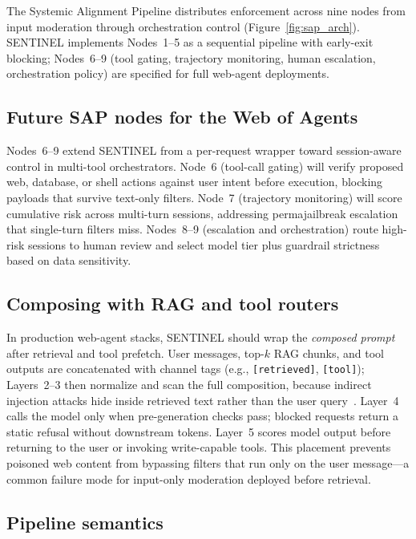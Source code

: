 \documentclass[conference]{IEEEtran}
\newcommand{\sap}{Systemic Alignment Pipeline}
\begin{document}
The \sap{} distributes enforcement across nine nodes from input moderation
through orchestration control (Figure~\ref{fig:sap_arch}).
SENTINEL implements Nodes~1--5 as a sequential pipeline with early-exit blocking;
Nodes~6--9 (tool gating, trajectory monitoring, human escalation, orchestration
policy) are specified for full web-agent deployments.

\subsection{Future SAP nodes for the Web of Agents}

Nodes~6--9 extend SENTINEL from a per-request wrapper toward session-aware
control in multi-tool orchestrators.
Node~6 (tool-call gating) will verify proposed web, database, or shell actions
against user intent before execution, blocking payloads that survive text-only
filters.
Node~7 (trajectory monitoring) will score cumulative risk across multi-turn
sessions, addressing permajailbreak escalation~\cite{anil2024many} that
single-turn filters miss.
Nodes~8--9 (escalation and orchestration) route high-risk sessions to human
review and select model tier plus guardrail strictness based on data sensitivity.

\subsection{Composing with RAG and tool routers}

In production web-agent stacks, SENTINEL should wrap the \emph{composed prompt}
after retrieval and tool prefetch.
User messages, top-$k$ RAG chunks, and tool outputs are concatenated with
channel tags (e.g., \texttt{[retrieved]}, \texttt{[tool]}); Layers~2--3 then
normalize and scan the full composition, because indirect injection attacks hide
inside retrieved text rather than the user query~\cite{greshake2023not,liu2024lost}.
Layer~4 calls the model only when pre-generation checks pass; blocked requests
return a static refusal without downstream tokens.
Layer~5 scores model output before returning to the user or invoking write-capable
tools.
This placement prevents poisoned web content from bypassing filters that run only
on the user message---a common failure mode for input-only moderation deployed
before retrieval.

\subsection{Pipeline semantics}
\end{document}
